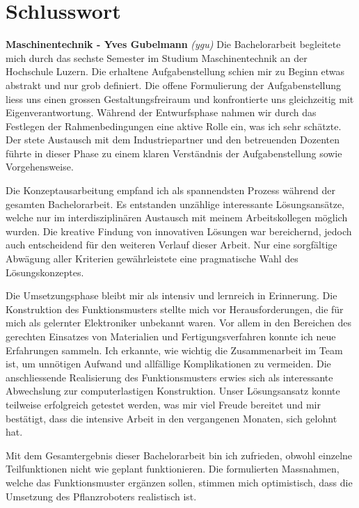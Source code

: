 \newpage
\section{Schlusswort}

\textbf{Maschinentechnik - Yves Gubelmann}
\newline
\textit{(ygu)} Die Bachelorarbeit begleitete mich durch das sechste Semester im Studium Maschinentechnik an der Hochschule Luzern. Die erhaltene Aufgabenstellung schien mir zu Beginn etwas abstrakt und nur grob definiert. Die offene Formulierung der Aufgabenstellung liess uns einen grossen Gestaltungsfreiraum und konfrontierte uns gleichzeitig mit Eigenverantwortung. Während der Entwurfsphase nahmen wir durch das Festlegen der Rahmenbedingungen eine aktive Rolle ein, was ich sehr schätzte. Der stete Austausch mit dem Industriepartner und den betreuenden Dozenten führte in dieser Phase zu einem klaren Verständnis der Aufgabenstellung sowie Vorgehensweise.
\newline

Die Konzeptausarbeitung empfand ich als spannendsten Prozess während der gesamten Bachelorarbeit. Es entstanden unzählige interessante Lösungsansätze, welche nur im interdisziplinären Austausch mit meinem Arbeitskollegen möglich wurden. Die kreative Findung von innovativen Lösungen war bereichernd, jedoch auch entscheidend für den weiteren Verlauf dieser Arbeit. Nur eine sorgfältige Abwägung aller Kriterien gewährleistete eine pragmatische Wahl des Lösungskonzeptes.
\newline

Die Umsetzungsphase bleibt mir als intensiv und lernreich in Erinnerung. Die Konstruktion des Funktionsmusters stellte mich vor Herausforderungen, die für mich als gelernter Elektroniker unbekannt waren. Vor allem in den Bereichen des gerechten Einsatzes von Materialien und Fertigungsverfahren konnte ich neue Erfahrungen sammeln. Ich erkannte, wie wichtig die Zusammenarbeit im Team ist, um unnötigen Aufwand und allfällige Komplikationen zu vermeiden. Die anschliessende Realisierung des Funktionsmusters erwies sich als interessante Abwechslung zur computerlastigen Konstruktion. Unser Lösungsansatz konnte teilweise erfolgreich getestet werden, was mir viel Freude bereitet und mir bestätigt, dass die intensive Arbeit in den vergangenen Monaten, sich gelohnt hat.
\newline

Mit dem Gesamtergebnis dieser Bachelorarbeit bin ich zufrieden, obwohl einzelne Teilfunktionen nicht wie geplant funktionieren. Die formulierten Massnahmen, welche das Funktionsmuster ergänzen sollen, stimmen mich optimistisch, dass die Umsetzung des Pflanzroboters realistisch ist.
\newline

